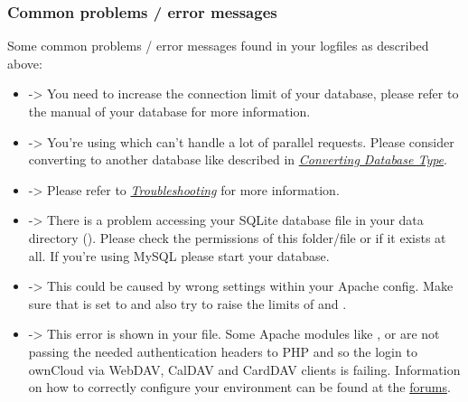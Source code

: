 \documentclass[letterpaper,10pt,english]{sphinxmanual}
\begin{document}


\subsubsection{Common problems / error messages}
\label{issues/general_troubleshooting:common-problems-error-messages}
Some common problems / error messages found in your logfiles as described above:
\begin{itemize}
\item {} 
 -\textgreater{} You need to increase the
connection limit of your database, please refer to the manual of your database
for more information.

\item {} 
 -\textgreater{} You're using
which can't handle a lot of parallel requests. Please consider converting to
another database like described in
{\hyperref[configuration_database/db_conversion::doc]{\emph{Converting Database Type}}}.

\item {} 
 -\textgreater{} Please
refer to {\hyperref[configuration_database/linux_database_configuration:db-troubleshooting-label]{\emph{Troubleshooting}}} for more information.

\item {} 
 -\textgreater{} There is a problem
accessing your SQLite database file in your data directory
(). Please check the permissions of this folder/file or
if it exists at all. If you're using MySQL please start your database.

\item {} 
 -\textgreater{} This could be caused by wrong
 settings within your Apache config. Make sure that
 is set to  and  also try to raise the limits of
 and  .

\item {} 
 -\textgreater{} This error is shown in your
 file. Some Apache modules like , 
or  are not passing the needed authentication headers to
PHP and so the login to ownCloud via WebDAV, CalDAV and CardDAV clients is
failing. Information on how to correctly configure your environment can be
found at the \href{https://central.owncloud.org/t/no-basic-authentication-headers-were-found-message/819}{forums}.

\end{itemize}
\end{document}
